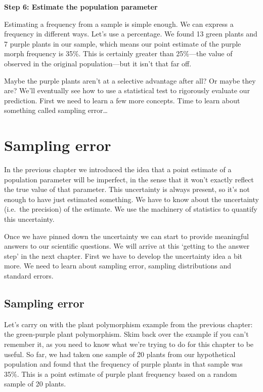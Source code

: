 \documentclass[]{book}
\begin{document}
\textbf{Step 6: Estimate the population parameter}

Estimating a frequency from a sample is simple enough. We can express a
frequency in different ways. Let's use a percentage. We found 13 green
plants and 7 purple plants in our sample, which means our point estimate
of the purple morph frequency is 35\%. This is certainly greater than
25\%---the value of observed in the original population---but it isn't
that far off.

Maybe the purple plants aren't at a selective advantage after all? Or
maybe they are? We'll eventually see how to use a statistical test to
rigorously evaluate our prediction. First we need to learn a few more
concepts. Time to learn about something called sampling error\ldots{}

\chapter{Sampling error}\label{sampling-error}

In the previous chapter we introduced the idea that a point estimate of
a population parameter will be imperfect, in the sense that it won't
exactly reflect the true value of that parameter. This uncertainty is
always present, so it's not enough to have just estimated something. We
have to know about the uncertainty (i.e.~the precision) of the estimate.
We use the machinery of statistics to quantify this uncertainty.

Once we have pinned down the uncertainty we can start to provide
meaningful answers to our scientific questions. We will arrive at this
`getting to the answer step' in the next chapter. First we have to
develop the uncertainty idea a bit more. We need to learn about sampling
error, sampling distributions and standard errors.

\hypertarget{sampling-error-1}{\section{Sampling
error}\label{sampling-error-1}}

Let's carry on with the plant polymorphism example from the previous
chapter: the green-purple plant polymorphism. Skim back over the example
if you can't remember it, as you need to know what we're trying to do
for this chapter to be useful. So far, we had taken one sample of 20
plants from our hypothetical population and found that the frequency of
purple plants in that sample was 35\%. This is a point estimate of
purple plant frequency based on a random sample of 20 plants.
\end{document}
